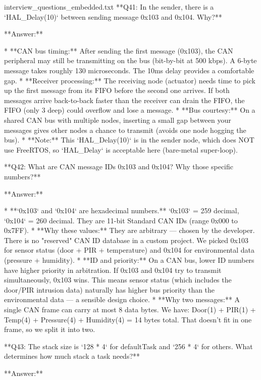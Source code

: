 \begin{filecontents*}{interview_questions_embedded.txt}
**Q41: In the sender, there is a `HAL_Delay(10)` between sending message 0x103 and 0x104. Why?**

**Answer:**

* **CAN bus timing:** After sending the first message (0x103), the CAN peripheral may still be transmitting on the bus (bit-by-bit at 500 kbps). A 6-byte message takes roughly 130 microseconds. The 10ms delay provides a comfortable gap.
* **Receiver processing:** The receiving node (actuator) needs time to pick up the first message from its FIFO before the second one arrives. If both messages arrive back-to-back faster than the receiver can drain the FIFO, the FIFO (only 3 deep) could overflow and lose a message.
* **Bus courtesy:** On a shared CAN bus with multiple nodes, inserting a small gap between your messages gives other nodes a chance to transmit (avoids one node hogging the bus).
* **Note:** This `HAL_Delay(10)` is in the sender node, which does NOT use FreeRTOS, so `HAL_Delay` is acceptable here (bare-metal super-loop).

**Q42: What are CAN message IDs 0x103 and 0x104? Why those specific numbers?**

**Answer:**

* **`0x103` and `0x104` are hexadecimal numbers.** `0x103` = 259 decimal, `0x104` = 260 decimal. They are 11-bit Standard CAN IDs (range 0x000 to 0x7FF).
* **Why these values:** They are arbitrary — chosen by the developer. There is no "reserved" CAN ID database in a custom project. We picked 0x103 for sensor status (door + PIR + temperature) and 0x104 for environmental data (pressure + humidity).
* **ID and priority:** On a CAN bus, lower ID numbers have higher priority in arbitration. If 0x103 and 0x104 try to transmit simultaneously, 0x103 wins. This means sensor status (which includes the door/PIR intrusion data) naturally has higher bus priority than the environmental data — a sensible design choice.
* **Why two messages:** A single CAN frame can carry at most 8 data bytes. We have: Door(1) + PIR(1) + Temp(4) + Pressure(4) + Humidity(4) = 14 bytes total. That doesn't fit in one frame, so we split it into two.

**Q43: The stack size is `128 * 4` for defaultTask and `256 * 4` for others. What determines how much stack a task needs?**

**Answer:**


\end{filecontents*}
